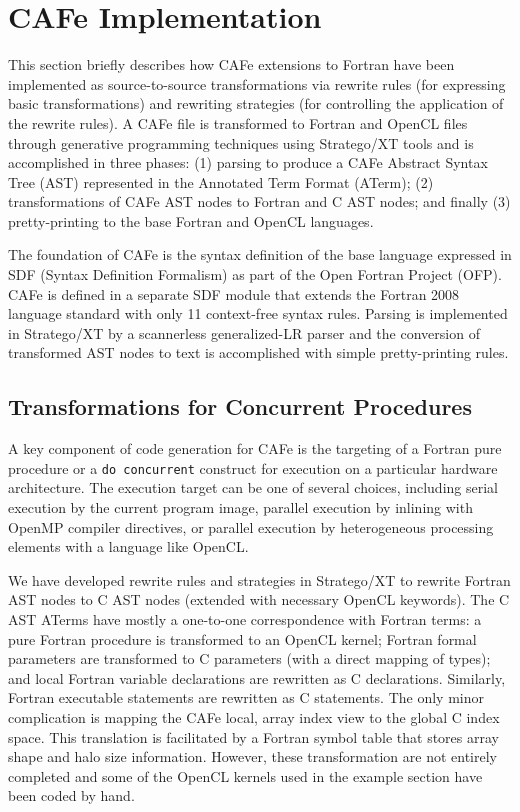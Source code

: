 \section{CAFe Implementation}

This section briefly describes how CAFe extensions to Fortran have been implemented as
source-to-source transformations via rewrite rules (for expressing basic transformations)
and rewriting strategies (for controlling the application of the rewrite rules).  A CAFe
file is transformed to Fortran and OpenCL files through generative programming techniques
using Stratego/XT tools\cite{Bravenboer200852} and is accomplished in three phases: (1)
parsing to produce a CAFe Abstract Syntax Tree (AST) represented in the Annotated Term
Format (ATerm\cite{DBLP:journals/spe/BrandJKO00}); (2) transformations of CAFe AST nodes
to Fortran and C AST nodes; and finally (3) pretty-printing to the base Fortran and OpenCL
languages.

The foundation of CAFe is the syntax definition of the base language expressed in SDF
(Syntax Definition Formalism) as part of the Open Fortran Project (OFP)\cite{OFP:git:url}.
CAFe is defined in a separate SDF module that extends the Fortran 2008 language standard
with only 11 context-free syntax rules.  Parsing is implemented in Stratego/XT by a
scannerless generalized-LR parser and the conversion of transformed AST nodes to text is
accomplished with simple pretty-printing rules.


\subsection{Transformations for Concurrent Procedures}

A key component of code generation for CAFe is the targeting of a Fortran pure procedure
or a \texttt{do concurrent} construct for execution on a particular hardware architecture.
The execution target can be one of several choices, including serial execution by the
current program image, parallel execution by inlining with OpenMP compiler directives, or
parallel execution by heterogeneous processing elements with a language like OpenCL.

We have developed rewrite rules and strategies in Stratego/XT to rewrite Fortran AST
nodes to C AST nodes (extended with necessary OpenCL keywords).  The C AST ATerms have mostly a
one-to-one correspondence with Fortran terms: a pure Fortran procedure is transformed to an
OpenCL kernel; Fortran formal parameters are transformed to C parameters (with a direct mapping of
types); and local Fortran variable declarations are rewritten as C declarations.  Similarly,
Fortran executable statements are rewritten as C statements.  The only
minor complication is mapping the CAFe local, array index view to the global C index space.  This
translation is facilitated by a Fortran symbol table that stores array shape and halo size
information.  However, these transformation are not entirely completed and some of the
OpenCL kernels used in the example section have been coded by hand.

